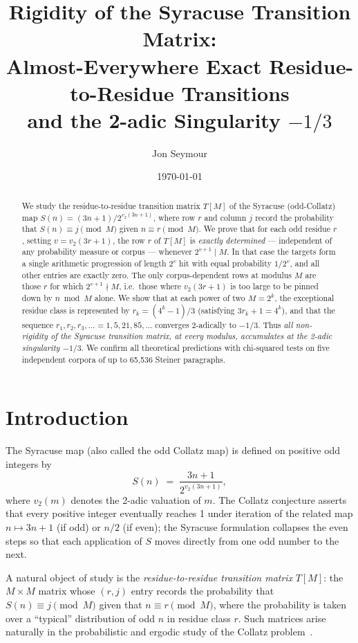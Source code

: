 \documentclass[12pt,a4paper]{article}
\title{Rigidity of the Syracuse Transition Matrix:\\
       Almost-Everywhere Exact Residue-to-Residue Transitions\\
       and the 2-adic Singularity $-1/3$}
\author{Jon Seymour}
\date{\today}
\begin{document}
\maketitle

\begin{abstract}
We study the residue-to-residue transition matrix $T[M]$ of the Syracuse
(odd-Collatz) map $S(n) = (3n+1)/2^{v_2(3n+1)}$, where row $r$ and column $j$
record the probability that $S(n) \equiv j \pmod{M}$ given $n \equiv r \pmod{M}$.
We prove that for each odd residue $r$, setting $v = v_2(3r+1)$, the row $r$ of
$T[M]$ is \emph{exactly determined} --- independent of any probability measure or
corpus --- whenever $2^{v+1} \mid M$.  In that case the targets form a single
arithmetic progression of length $2^v$ hit with equal probability $1/2^v$,
and all other entries are exactly zero.  The only corpus-dependent rows at
modulus $M$ are those $r$ for which $2^{v+1} \nmid M$, i.e.\ those where $v_2(3r+1)$
is too large to be pinned down by $n \bmod M$ alone.  We show that at each power
of two $M = 2^k$, the exceptional residue class is represented by
$r_k = (4^k-1)/3$ (satisfying $3r_k + 1 = 4^k$), and that the sequence
$r_1, r_2, r_3, \ldots = 1, 5, 21, 85, \ldots$ converges 2-adically to
$-1/3$.  Thus \emph{all non-rigidity of the Syracuse transition matrix, at
every modulus, accumulates at the 2-adic singularity $-1/3$}.  We confirm
all theoretical predictions with chi-squared tests on five independent corpora of
up to 65{,}536 Steiner paragraphs.
\end{abstract}

\tableofcontents

\section{Introduction}
\label{sec:intro}

The Syracuse map (also called the odd Collatz map) is defined on positive odd
integers by
\[
  S(n) \;=\; \frac{3n+1}{2^{v_2(3n+1)}},
\]
where $v_2(m)$ denotes the 2-adic valuation of $m$.  The Collatz conjecture
asserts that every positive integer eventually reaches 1 under iteration of
the related map $n \mapsto 3n+1$ (if odd) or $n/2$ (if even); the Syracuse
formulation collapses the even steps so that each application of $S$ moves
directly from one odd number to the next.

A natural object of study is the \emph{residue-to-residue transition matrix}
$T[M]$: the $M \times M$ matrix whose $(r,j)$ entry records the probability
that $S(n) \equiv j \pmod{M}$ given that $n \equiv r \pmod{M}$, where the
probability is taken over a ``typical'' distribution of odd $n$ in residue
class $r$.  Such matrices arise naturally in the probabilistic and ergodic
study of the Collatz problem~\cite{Lagarias2010}.
\end{document}

